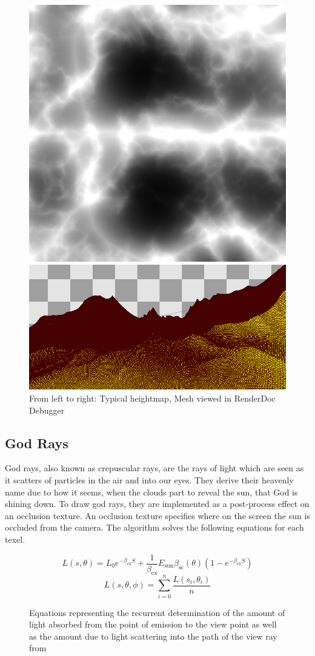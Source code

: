 \documentclass[10pt, openany]{book}
\begin{document}
\begin{figure}[H]
	\centering
	\begin{minipage}{.35\textwidth}
		\centering
	  	\includegraphics[width=.6\linewidth]{ridged-noise}
	\end{minipage}%
	\begin{minipage}{.65\textwidth}
	  	\centering
	  	\includegraphics[width=.6\linewidth]{mesh}
	\end{minipage}
	\caption{From left to right: Typical heightmap, Mesh viewed in RenderDoc Debugger}
\end{figure}

\subsection{God Rays}

God rays, also known as crepuscular rays, are the rays of light which are seen as it scatters of particles in the air and into our eyes. They derive their heavenly name due to how it seems, when the clouds part to reveal the sun, that God is shining down. To draw god rays, they are implemented as a post-process effect on an occlusion texture. An occlusion texture specifies where on the screen the sun is occluded from the camera. The algorithm solves the following equations for each texel.

\begin{figure}[H]
	\centering
	\[L(s,\theta) = L_{0}e^{-\beta_{\text{ex}}S} + \frac{1}{\beta_{\text{ex}}}E_{\text{sun}}\beta_{\text{sc}}(\theta)(1-e^{-\beta_{\text{ex}}S})\]
	\[L(s,\theta,\phi) = \sum_{i=0}^{n}\frac{L(s_i,\theta_i)}{n}\]
	\caption{Equations representing the recurrent determination of the amount of light absorbed from the point of emission to the view point as well as the amount due to light scattering into the path of the view ray from \citep{gpugems3}}
\end{figure}
\end{document}
